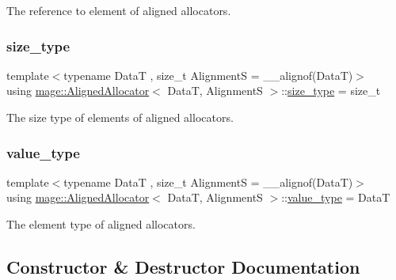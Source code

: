 The reference to element of aligned allocators. \hypertarget{structmage_1_1_aligned_allocator_a7184b9ffd131938071f9734e9291976e}{}\label{structmage_1_1_aligned_allocator_a7184b9ffd131938071f9734e9291976e} 
\subsubsection{\texorpdfstring{size\+\_\+type}{size\_type}}
{\footnotesize\ttfamily template$<$typename DataT , size\+\_\+t AlignmentS = \+\_\+\+\_\+alignof(\+Data\+T)$>$ \\
using \hyperlink{structmage_1_1_aligned_allocator}{mage\+::\+Aligned\+Allocator}$<$ DataT, AlignmentS $>$\+::\hyperlink{structmage_1_1_aligned_allocator_a7184b9ffd131938071f9734e9291976e}{size\+\_\+type} =  size\+\_\+t}

The size type of elements of aligned allocators. \hypertarget{structmage_1_1_aligned_allocator_a04614928948b5589c241726e3441e058}{}\label{structmage_1_1_aligned_allocator_a04614928948b5589c241726e3441e058} 
\subsubsection{\texorpdfstring{value\+\_\+type}{value\_type}}
{\footnotesize\ttfamily template$<$typename DataT , size\+\_\+t AlignmentS = \+\_\+\+\_\+alignof(\+Data\+T)$>$ \\
using \hyperlink{structmage_1_1_aligned_allocator}{mage\+::\+Aligned\+Allocator}$<$ DataT, AlignmentS $>$\+::\hyperlink{structmage_1_1_aligned_allocator_a04614928948b5589c241726e3441e058}{value\+\_\+type} =  DataT}

The element type of aligned allocators. 

\subsection{Constructor \& Destructor Documentation}
\hypertarget{structmage_1_1_aligned_allocator_a95363950f216346db818997988be73bf}{}\label{structmage_1_1_aligned_allocator_a95363950f216346db818997988be73bf} 
